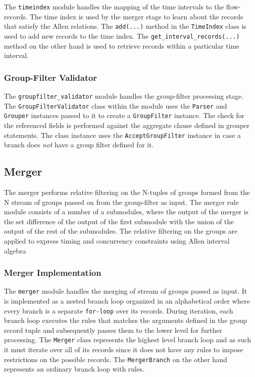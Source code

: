 The \texttt{timeindex} module handles the mapping of the time intervals to the flow-records. The time index is used by the merger stage to learn about the records that satisfy the Allen relations. The \texttt{add(...)} method in the \texttt{TimeIndex} class is used to add new records to the time index. The \texttt{get\_interval\_records(...)} method on the other hand is used to retrieve records within a particular time interval.

\subsubsection{Group-Filter Validator}\label{subsubsec:group-filter-validator}
The \texttt{groupfilter\_validator} module handles the group-filter processing stage. The \texttt{GroupFilterValidator} class within the module uses the \texttt{Parser} and \texttt{Grouper} instances passed to it to create a \texttt{GroupFilter} instance. The check for the referenced fields is performed against the aggregate clause defined in grouper statements. The class instance uses the \texttt{AcceptGroupFilter} instance in case a branch does \emph{not} have a group filter defined for it.

\subsection{Merger}\label{subsec:merger}
The merger performs relative filtering on the N-tuples of groups formed from the N stream of groups passed on from the group-filter as input. The merger rule module consists of a number of a submodules, where the output of the merger is the set difference of the output of the first submodule with the union of the output of the rest of the submodules. The relative filtering on the groups are applied to express timing and concurrency constraints using Allen interval algebra \cite{fallen:1983}

\subsubsection{Merger Implementation}\label{subsubsec:merger-impl}
The \texttt{merger} module handles the merging of stream of groups passed as input. It is implemented as a nested branch loop organized in an alphabetical order where every branch is a separate \texttt{for-loop} over its records. During iteration, each branch loop executes the rules that matches the arguments defined in the group record tuple and subsequently passes them to the lower level for further processing. The \texttt{Merger} class represents the highest level branch loop and as such it must iterate over all of its records since it does not have any rules to impose restrictions on the possible records. The \texttt{MergerBranch} on the other hand represents an ordinary branch loop with rules.

